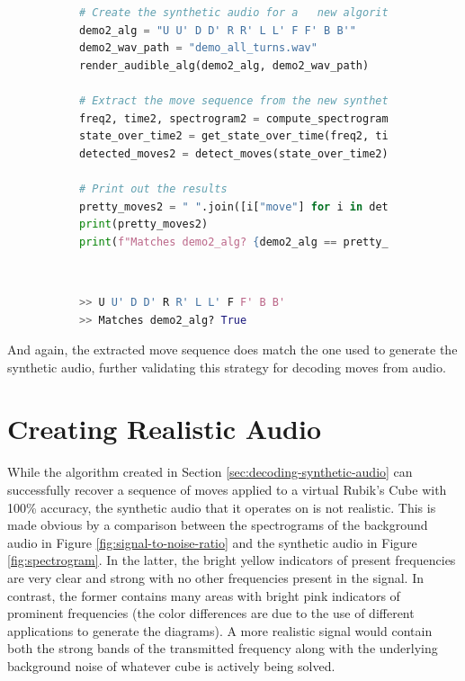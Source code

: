 \begin{figure}[h]
\caption{Full Example: Audio generation and move extraction}
\label{fig:code-synthetic-extraction-demo} 
\begin{subfigure}{\textwidth}
\begin{lstlisting}[language=Python]
# Create the synthetic audio for a   new algorithm
demo2_alg = "U U' D D' R R' L L' F F' B B'"
demo2_wav_path = "demo_all_turns.wav"
render_audible_alg(demo2_alg, demo2_wav_path)

# Extract the move sequence from the new synthetic audio
freq2, time2, spectrogram2 = compute_spectrogram(demo2_wav_path)
state_over_time2 = get_state_over_time(freq2, time2, spectrogram2)
detected_moves2 = detect_moves(state_over_time2)

# Print out the results
pretty_moves2 = " ".join([i["move"] for i in detected_moves2])
print(pretty_moves2)
print(f"Matches demo2_alg? {demo2_alg == pretty_moves2}")
\end{lstlisting}
\end{subfigure}\\

\begin{subfigure}{\textwidth}
\begin{lstlisting}[language=Python, numbers=none]
>> U U' D D' R R' L L' F F' B B'
>> Matches demo2_alg? True
\end{lstlisting}
\end{subfigure}
\end{figure}

And again, the extracted move sequence does match the one used to generate the synthetic audio, further validating this strategy for decoding moves from audio.

\newpage
\section{Creating Realistic Audio}
\label{sec:adding-realistic-noise}
While the algorithm created in Section \ref{sec:decoding-synthetic-audio} can successfully recover a sequence of moves applied to a virtual Rubik's Cube with 100\% accuracy, the synthetic audio that it operates on is not realistic.
This is made obvious by a comparison between the spectrograms of the background audio in Figure \ref{fig:signal-to-noise-ratio} and the synthetic audio in Figure \ref{fig:spectrogram}.
In the latter, the bright yellow indicators of present frequencies are very clear and strong with no other frequencies present in the signal.
In contrast, the former contains many areas with bright pink indicators of prominent frequencies (the color differences are due to the use of different applications to generate the diagrams).
A more realistic signal would contain both the strong bands of the transmitted frequency along with the underlying background noise of whatever cube is actively being solved.


